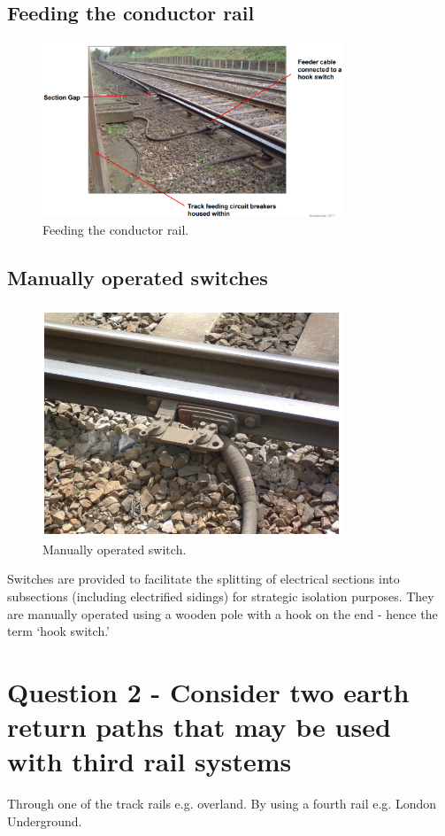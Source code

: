 \subsection{Feeding the conductor rail}
\begin{figure}[H]
    \centering
    \includegraphics[width = 0.8\textwidth]{img/figure128.png}
    \caption{Feeding the conductor rail.}
\end{figure}
\subsection{Manually operated switches}
\begin{figure}[H]
    \centering
    \includegraphics[width = 0.8\textwidth]{img/figure129.png}
    \caption{Manually operated switch.}
\end{figure}
Switches are provided to facilitate the splitting of electrical sections into subsections (including electrified sidings) for strategic isolation purposes. They are manually operated using a wooden pole with a hook on the end - hence the term `hook switch.'
\section{Question 2 - Consider two earth return paths that may be used with third rail systems}
Through one of the track rails e.g. overland. By using a fourth rail e.g. London Underground.

